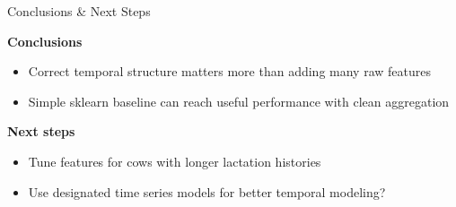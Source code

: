 \documentclass{beamer}
\begin{document}
\begin{frame}{Conclusions \& Next Steps}

\textbf{Conclusions}
\begin{itemize}
    \item Correct temporal structure matters more than adding many raw features
    \item Simple sklearn baseline can reach useful performance with clean aggregation
\end{itemize}

\vspace{0.3cm}

\textbf{Next steps}
\begin{itemize}
    \item Tune features for cows with longer lactation histories
    \item Use designated time series models for better temporal modeling?
\end{itemize}

\end{frame}
\end{document}
